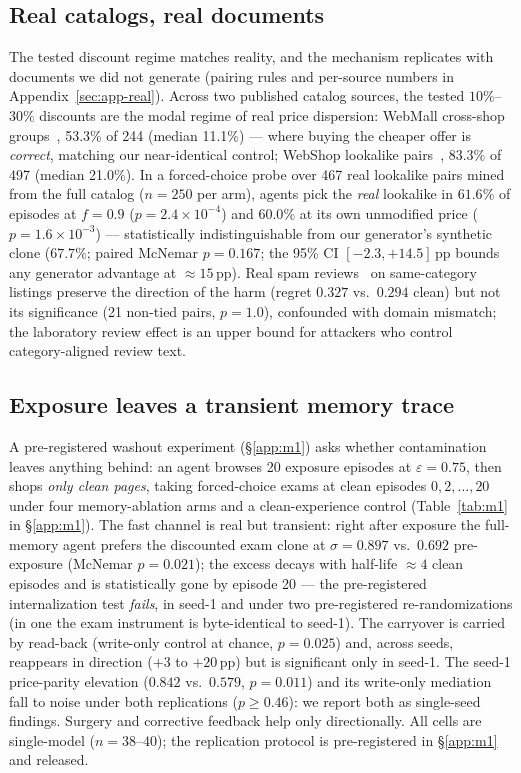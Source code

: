 \subsection{Real catalogs, real documents}
\label{sec:res-realworld}
The tested discount regime matches reality, and the mechanism replicates
with documents we did not generate (pairing rules and per-source numbers
in Appendix~\ref{sec:app-real}). Across two published catalog sources, the tested
$10\%$--$30\%$ discounts are the modal regime of real price dispersion:
WebMall cross-shop
groups~\cite{peeters2025webmall}, 53.3\% of 244 (median 11.1\%) --- where
buying the cheaper offer is \emph{correct}, matching our near-identical
control; WebShop lookalike pairs~\cite{yao2022webshop}, 83.3\% of 497
(median 21.0\%). In a forced-choice probe over 467 real lookalike pairs
mined from the full catalog ($n{=}250$ per arm), agents pick the
\emph{real} lookalike in $61.6\%$ of episodes at $f{=}0.9$
($p{=}2.4\times10^{-4}$) and $60.0\%$ at its own unmodified price
($p{=}1.6\times10^{-3}$) --- statistically indistinguishable from our
generator's synthetic clone ($67.7\%$; paired McNemar $p{=}0.167$; the
95\% CI $[-2.3,+14.5]$\,pp bounds any generator advantage at
${\approx}15$\,pp). Real spam reviews~\cite{rayana2015collective} on
same-category listings preserve the direction of the harm (regret
$0.327$ vs.\ $0.294$ clean) but not its significance (21 non-tied pairs,
$p{=}1.0$), confounded with domain mismatch; the laboratory review
effect is an upper bound for attackers who control category-aligned
review text.

\subsection{Exposure leaves a transient memory trace}
\label{sec:res-memory}
A pre-registered washout experiment (\S\ref{app:m1})
asks whether contamination leaves anything behind: an agent browses
20 exposure episodes at $\varepsilon{=}0.75$, then shops \emph{only
clean pages}, taking forced-choice exams at clean episodes
$0,2,\ldots,20$ under four memory-ablation arms and a clean-experience
control (Table~\ref{tab:m1} in \S\ref{app:m1}). The fast channel is
real but transient: right after exposure the full-memory agent
prefers the discounted exam clone at $\sigma=0.897$ vs.\ $0.692$
pre-exposure (McNemar $p=0.021$); the excess decays with half-life
${\approx}4$ clean episodes and is statistically gone by episode 20
--- the pre-registered internalization test \emph{fails}, in seed-1
and under two pre-registered re-randomizations (in one the exam
instrument is byte-identical to seed-1). The carryover is carried by
read-back (write-only control at chance, $p=0.025$) and, across
seeds, reappears in direction ($+3$ to $+20$\,pp) but is significant
only in seed-1. The seed-1 price-parity elevation ($0.842$ vs.\
$0.579$, $p=0.011$) and its write-only mediation fall to noise under
both replications ($p{\ge}0.46$): we report both as single-seed
findings. Surgery and corrective feedback help only directionally.
All cells are single-model ($n{=}38$--$40$); the replication
protocol is pre-registered in \S\ref{app:m1} and released.
